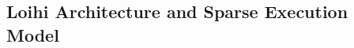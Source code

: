 \documentclass{article}
\begin{document}
%
%
%
%
%

\subsection{Loihi Architecture and Sparse Execution Model}
\end{document}
